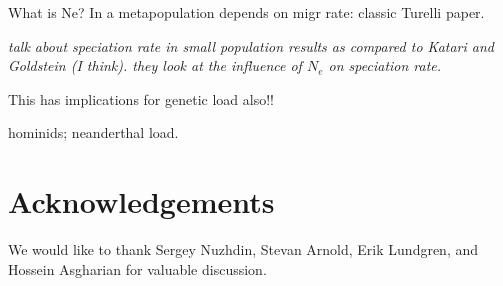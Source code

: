 \documentclass{article}
\newcommand{\jss}[1]{{\color{olive}\it #1}}
\newcommand{\1}{\mathbbm{1}}
\begin{document}
What is Ne?  In a metapopulation depends on migr rate: classic Turelli paper.

\jss{talk about speciation rate in small population results as compared to Katari and Goldstein (I think). they look at the influence of $N_e$ on speciation rate.}

This has implications for genetic load also!!

hominids; neanderthal load.


\section*{Acknowledgements}
We would like to thank Sergey Nuzhdin, Stevan Arnold, Erik Lundgren, and Hossein Asgharian for valuable discussion.




\normalsize
\end{document}
